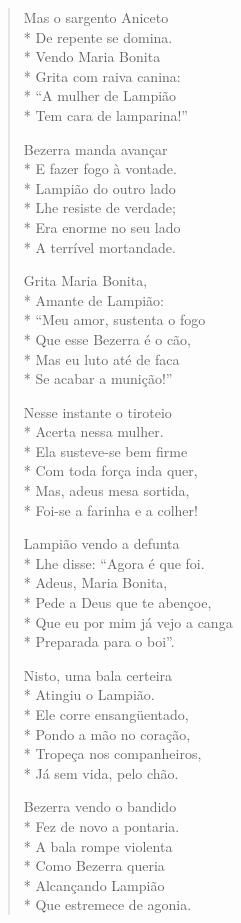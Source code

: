 \begin{verse}
Mas o sargento Aniceto\\*
De repente se domina.\\*
Vendo Maria Bonita\\*
Grita com raiva canina:\\*
“A mulher de Lampião\\*
Tem cara de lamparina!”

Bezerra manda avançar\\*
E fazer fogo à vontade.\\*
Lampião do outro lado\\*
Lhe resiste de verdade;\\*
Era enorme no seu lado\\*
A terrível mortandade.

Grita Maria Bonita,\\*
Amante de Lampião:\\*
“Meu amor, sustenta o fogo\\*
Que esse Bezerra é o cão,\\*
Mas eu luto até de faca\\*
Se acabar a munição!”

Nesse instante o tiroteio\\*
Acerta nessa mulher.\\*
Ela susteve-se bem firme\\*
Com toda força inda quer,\\*
Mas, adeus mesa sortida,\\*
Foi-se a farinha e a colher!

Lampião vendo a defunta\\*
Lhe disse: “Agora é que foi.\\*
Adeus, Maria Bonita,\\*
Pede a Deus que te abençoe,\\*
Que eu por mim já vejo a canga\\*
Preparada para o boi”.

Nisto, uma bala certeira\\*
Atingiu o Lampião.\\*
Ele corre ensangüentado,\\*
Pondo a mão no coração,\\*
Tropeça nos companheiros,\\*
Já sem vida, pelo chão.

Bezerra vendo o bandido\\*
Fez de novo a pontaria.\\*
A bala rompe violenta\\*
Como Bezerra queria\\*
Alcançando Lampião\\*
Que estremece de agonia.


\end{verse}
